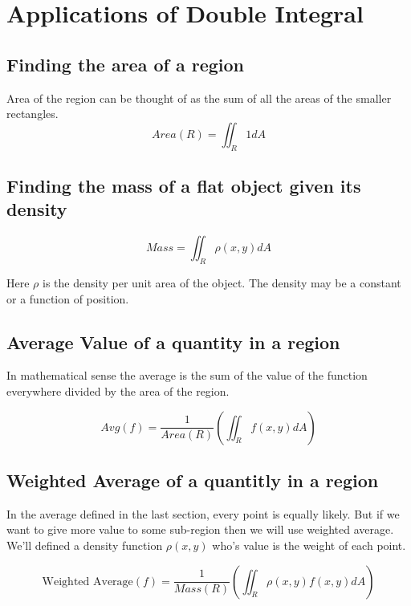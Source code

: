 

\chapter{Applications of Double Integral}

\bigbreak

\section{Finding the area of a region}

Area of the region can be thought of as the sum of all the areas of the smaller rectangles.
$$ Area(R) = \iint_R 1 dA $$

\section{Finding the mass of a flat object given its density}

$$ Mass = \iint_R \rho(x, y) dA $$

Here $\rho$ is the density per unit area of the object. 
The density may be a constant or a function of position.

\section{Average Value of a quantity in a region}

In mathematical sense the average is the sum of the value of the function everywhere divided by the area of the region.

$$ Avg(f) = \frac{1}{Area(R)}  \left( \iint_R f(x, y) dA \right) $$

\section{Weighted Average of a quantitly in a region}

In the average defined in the last section, every point is equally likely.
But if we want to give more value to some sub-region then we will use weighted average. 
We'll defined a density function $\rho(x, y)$ who's value is the weight of each point.

$$  \text{Weighted Average}(f) = \frac{1}{Mass(R)} \left( \iint_R \rho(x, y) f(x, y) dA \right) $$

